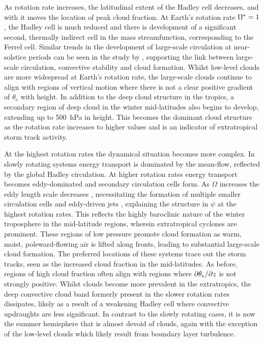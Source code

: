 As rotation rate increases, the latitudinal extent of the Hadley cell decreases, and with it moves the location of peak cloud fraction. At Earth's rotation rate $\Omega^*=1$, the Hadley cell is much reduced and there is development of a significant second, thermally indirect cell in the mass streamfunction, corresponding to the Ferrel cell. Similar trends in the development of large-scale circulation at near-solstice periods can be seen in the study by \citet{faulk2017-Effects}, supporting the link between large-scale circulation, convective stability and cloud formation. Whilst low-level clouds are more widespread at Earth's rotation rate, the large-scale clouds continue to align with regions of vertical motion where there is not a clear positive gradient of $\theta_e$ with height. In addition to the deep cloud structure in the tropics, a secondary region of deep cloud in the winter mid-latitudes also begins to develop, extending up to \SI{500}{\hecto\Pa} in height. This becomes the dominant cloud structure as the rotation rate increases to higher values and is an indicator of extratropical storm track activity.

At the highest rotation rates the dynamical situation becomes more complex. In slowly rotating systems energy transport is dominated by the mean-flow, reflected by the global Hadley circulation. At higher rotation rates energy transport becomes eddy-dominated \citep{kaspi2015-ATMOSPHERIC} and secondary circulation cells form. As $\Omega$ increases the eddy length scale decreases \citep{kaspi2015-ATMOSPHERIC, showman2015-THREEDIMENSIONAL, rhines1979-Geostrophic}, necessitating the formation of multiple smaller circulation cells and eddy-driven jets \citep{chemke2015-Poleward, wang2018-Comparative}, explaining the structure in $\psi$ at the highest rotation rates. This reflects the highly baroclinic nature of the winter troposphere in the mid-latitude regions, wherein extratropical cyclones are prominent. These regions of low pressure promote cloud formation as warm, moist, poleward-flowing air is lifted along fronts, leading to substantial large-scale cloud formation. The preferred locations of these systems trace out the storm tracks, seen as the increased cloud fraction in the mid-latitudes. As before, regions of high cloud fraction often align with regions where $\partial\theta_e/\partial z$ is not strongly positive. Whilst clouds become more prevalent in the extratropics, the deep convective cloud band formerly present in the slower rotation rates dissipates, likely as a result of a weakening Hadley cell where convective updraughts are less significant. In contrast to the slowly rotating cases, it is now the summer hemisphere that is almost devoid of clouds, again with the exception of the low-level clouds which likely result from boundary layer turbulence.



